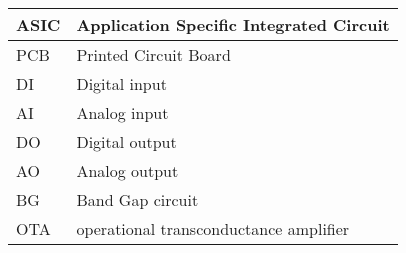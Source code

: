 \begin{tabularx}{\linewidth}{|l|X|}
\hline
\rowcolor{lightgray}  ASIC & Application Specific Integrated Circuit \hspace{100 mm}  \\
\hline
\endhead
PCB & Printed Circuit Board \\
\hline
DI & Digital input \\
\hline
AI & Analog input \\
\hline
DO & Digital output \\
\hline
AO & Analog output \\
\hline
BG & Band Gap circuit \\
\hline
OTA & operational transconductance amplifier \\
\hline
\end{tabularx}
\pagebreak

\FloatBarrier
